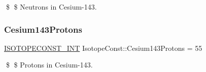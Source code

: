 \$ \$ Neutrons in Cesium-\/143. \mbox{\label{group___isotope_const-_cesium-_cs143_ga94f5dd70b0698690be5e0bf46ea2dc48}} 
\subsubsection{\texorpdfstring{Cesium143\+Protons}{Cesium143Protons}}
{\footnotesize\ttfamily \mbox{\hyperlink{group___isotope_const-_macros_ga5f18360b3e99483a35c32d789e62621c}{I\+S\+O\+T\+O\+P\+E\+C\+O\+N\+S\+T\+\_\+\+I\+NT}} Isotope\+Const\+::\+Cesium143\+Protons = 55}

\$ \$ Protons in Cesium-\/143. 